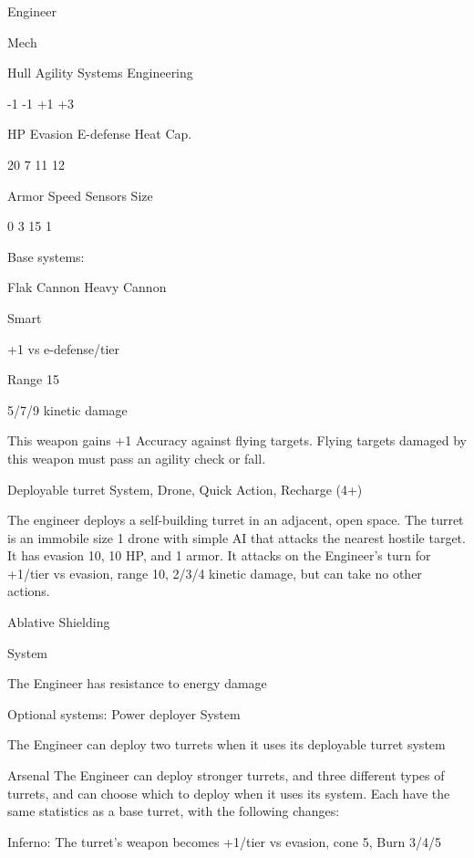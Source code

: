  Engineer 

 Mech 

 Hull       Agility      Systems       Engineering 

 -1         -1           +1            +3 

 HP         Evasion      E-defense     Heat Cap. 

 20         7            11            12 

 Armor      Speed        Sensors       Size 

 0          3            15            1 

Base systems:
 
Flak Cannon  
Heavy Cannon
 
Smart
 
+1 vs e-defense/tier
 
Range 15
 
5/7/9 kinetic damage
 
This weapon gains +1 Accuracy against flying targets. Flying targets damaged by this weapon  
must pass an agility check or fall.
 

Deployable turret  
System, Drone, Quick Action, Recharge (4+)
 
The engineer deploys a self-building turret in an adjacent, open space. The turret is an immobile  
size 1 drone with simple AI that attacks the nearest hostile target. It has evasion 10, 10 HP, and 1  
armor. It attacks on the Engineer’s turn for +1/tier vs evasion, range 10, 2/3/4 kinetic damage,  
but can take no other actions.
 

Ablative Shielding
 
System
 
The Engineer has resistance to energy damage
 

                                                                                                          


Optional systems:  
Power deployer  
System
 
The Engineer can deploy two turrets when it uses its deployable turret system
 

Arsenal  
The Engineer can deploy stronger turrets, and three different types of turrets, and can choose  
which to deploy when it uses its system. Each have the same statistics as a base turret, with the  
following changes:
 
         Inferno: The turret’s weapon becomes +1/tier vs evasion, cone 5, Burn 3/4/5
 
